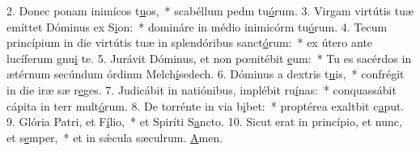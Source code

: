 2. Donec ponam inimícos t\uline{u}os,~* scabéllum pedm tu\uline{ó}rum.
3. Virgam virtútis tuæ emíttet Dóminus ex S\uline{i}on:~* domináre in médio inimicórm tu\uline{ó}rum.
4. Tecum princípium in die virtútis tuæ in splendóribus sanct\uline{ó}rum:~* ex útero ante lucíferum gnu\uline{i} te.
5. Jurávit Dóminus, et non pœnitébit \uline{e}um:~* Tu es sacérdos in ætérnum secúndum órdinm Melch\uline{í}sedech.
6. Dóminus a dextris t\uline{u}is,~* confrégit in die iræ sæ r\uline{e}ges.
7. Judicábit in natiónibus, implébit ru\uline{í}nas:~* conquassábit cápita in terr mult\uline{ó}rum.
8. De torrénte in via b\uline{i}bet:~* proptérea exaltbit c\uline{a}put.
9. Glória Patri, et F\uline{í}lio,~* et Spiríti S\uline{a}ncto.
10. Sicut erat in princípio, et nunc, et s\uline{e}mper,~* et in sǽcula sæculrum. \uline{A}men.
